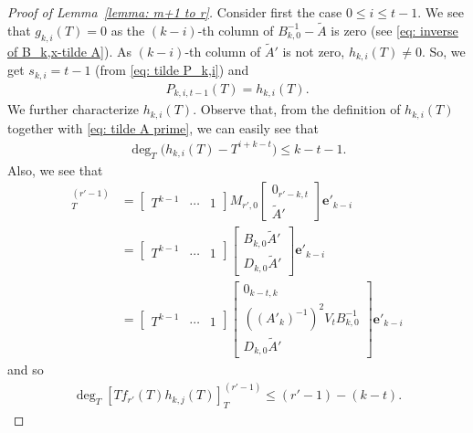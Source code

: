 \documentclass[11pt]{amsart}
\theoremstyle{definition}
\numberwithin{equation}{subsection}
\theoremstyle{plain}
\theoremstyle{plain}
\theoremstyle{plain}
\theoremstyle{plain}
\theoremstyle{plain}
\theoremstyle{plain}
\theoremstyle{plain}
\theoremstyle{plain}
\theoremstyle{plain}
\theoremstyle{plain}
\theoremstyle{plain}
\theoremstyle{plain}
\theoremstyle{definition}
\theoremstyle{definition}
\theoremstyle{definition}
\theoremstyle{remark}
\renewcommand{\(}{\textup{(}}
\renewcommand{\)}{\textup{)}}
\begin{document}
\begin{proof}[Proof of Lemma~\ref{lemma: m+1 to r}]
Consider first the case $0\leq i\leq t-1$. We see that $g_{k,i}(T)=0$ as the $(k-i)$-th column of $B_{k,0}^{-1}-\tilde A$ is zero (see \eqref{eq: inverse of B_k,x-tilde A}). As $(k-i)$-th column of $\tilde A'$ is not zero, $h_{k,i}(T)\neq 0$. So, we get $s_{k,i}=t-1$ (from \eqref{eq: tilde P_k,i}) and
    \begin{align*}
        P_{k,i,t-1}(T)
        =h_{k,i}(T).
    \end{align*}
We further characterize $h_{k,i}(T)$. Observe that, from the definition of $h_{k,i}(T)$ together with \eqref{eq: tilde A prime}, we can easily see that
    \begin{align*}
        \deg_T\big(h_{k,i}(T)-T^{i+k-t}\big)
        \leq
        k-t-1.
    \end{align*}
Also, we see that
    \begin{align*}
        [Tf_{r'}(T)h_{k,i}(T)]_{T}^{(r'-1)}
        &=
        \begin{bmatrix}
            T^{k-1} & \cdots & 1
        \end{bmatrix}
        M_{r',0}
        \begin{bmatrix}
            0_{r'-k,t} \\
            \tilde A'
        \end{bmatrix}
        \mathbf{e}'_{k-i}
        \\&=
        \begin{bmatrix}
            T^{k-1} & \cdots & 1
        \end{bmatrix}
        \begin{bmatrix}
          B_{k,0}\tilde A' \\
          D_{k,0}\tilde A'
        \end{bmatrix}
        \mathbf{e}'_{k-i}
        \\&=
        \begin{bmatrix}
            T^{k-1} & \cdots & 1
        \end{bmatrix}
        \begin{bmatrix}
            0_{k-t,k} \\
            ((A'_k)^{-1})^2V_tB_{k,0}^{-1}\\
            D_{k,0}\tilde A'
        \end{bmatrix}
        \mathbf{e}'_{k-i}
    \end{align*}
and so
    \begin{align*}
        \deg_T [Tf_{r'}(T)h_{k,j}(T)]_{T}^{(r'-1)} \leq (r'-1)-(k-t).
    \end{align*}

\end{proof}
\end{document}
